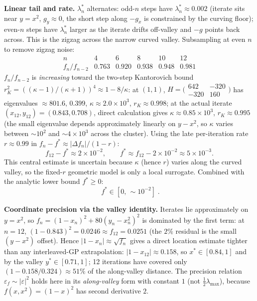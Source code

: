 \documentclass[11pt,a4paper]{article}
\begin{document}
\textbf{Linear tail and rate.}
$\lambda_n^{\ast}$ alternates: odd-$n$ steps have $\lambda_n^{\ast}\approx 0.002$ (iterate sits near $y=x^{2}$, $g_y\approx 0$, the short step along $-g_x$ is constrained by the curving floor); even-$n$ steps have $\lambda_n^{\ast}$ larger as the iterate drifts off-valley and $-g$ points back across. This is the zigzag across the narrow curved valley. Subsampling at even $n$ to remove zigzag noise:
\[
\begin{array}{c|ccccc}
n & 4 & 6 & 8 & 10 & 12\\\hline
f_n/f_{n-2} & 0.763 & 0.920 & 0.938 & 0.948 & 0.981
\end{array}
\]
$f_n/f_{n-2}$ is \emph{increasing} toward the two-step Kantorovich bound~\cite{luenberger-ye} $r_K^{2}=((\kappa-1)/(\kappa+1))^{4}\approx 1-8/\kappa$: at $(1,1)$, $H=\bigl(\begin{smallmatrix}642 & -320\\ -320 & 160\end{smallmatrix}\bigr)$ has eigenvalues $\approx 801.6,\,0.399$, $\kappa\approx 2.0\times 10^{3}$, $r_K\approx 0.998$; at the actual iterate $(x_{12},y_{12})=(0.843,0.708)$, direct calculation gives $\kappa\approx 0.85\times 10^{3}$, $r_K\approx 0.995$ (the small eigenvalue depends approximately linearly on $y-x^{2}$, so $\kappa$ varies between $\sim 10^{2}$ and $\sim 4\!\times\!10^{3}$ across the cluster). Using the late per-iteration rate $r\approx 0.99$ in $f_n-f^{\ast}\approx |\Delta f_n|/(1-r)$:
\[
f_{12}-f^{\ast}\approx 2\times 10^{-2},\qquad f^{\ast}\approx f_{12}-2\times 10^{-2}\approx 5\times 10^{-3}.
\]
This central estimate is uncertain because $\kappa$ (hence $r$) varies along the curved valley, so the fixed-$r$ geometric model is only a local surrogate. Combined with the analytic lower bound $f^{\ast}\ge 0$:
\[
\boxed{\;f^{\ast}\in[0,\,\sim\!10^{-2}]\;.}
\]

\textbf{Coordinate precision via the valley identity.}
Iterates lie approximately on $y=x^{2}$, so $f_n = (1-x_n)^{2}+80(y_n-x_n^{2})^{2}$ is dominated by the first term: at $n=12$, $(1-0.843)^{2}=0.0246\approx f_{12}=0.0251$ (the $2\%$ residual is the small $(y-x^{2})$ offset). Hence $|1-x_n|\approx\sqrt{f_n}$ gives a direct location estimate tighter than any interleaved-GP extrapolation: $|1-x_{12}|\approx 0.158$, so $x^{\ast}\in[0.84,1]$ and by the valley $y^{\ast}\in[0.71,1]$; 12 iterations have covered only $(1-0.158/0.324)\approx 51\%$ of the along-valley distance. The precision relation $\varepsilon_f\sim|\varepsilon|^{2}$ holds here in its \emph{along-valley} form with constant $1$ (not $\tfrac12\lambda_{\max}$), because $f(x,x^{2})=(1-x)^{2}$ has second derivative $2$.
\end{document}
